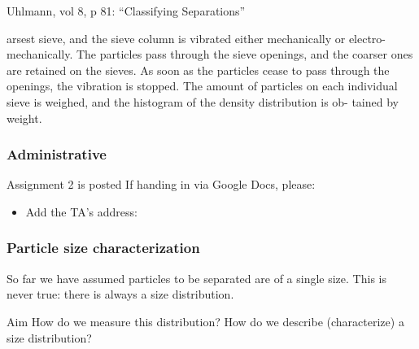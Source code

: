 Uhlmann, vol 8, p 81: ``Classifying Separations''

arsest sieve, and the sieve column is vibrated either mechanically or electro-mechanically. The particles pass through the sieve openings, and the coarser ones are retained on the sieves. As soon as the particles cease to pass through the openings, the vibration is stopped. The amount of particles on each individual sieve is weighed, and the histogram of the density distribution is ob- tained by weight.


\begin{frame}\frametitle{Administrative}
	Assignment 2 is posted
	\vspace{12pt}
	If handing in via Google Docs, please:
	\begin{itemize}
		\item	Add the TA's address: 
	\end{itemize}
\end{frame}

\begin{frame}\frametitle{Particle size characterization}
	So far we have assumed particles to be separated are of a single size. This is never true: there is always a size distribution.
	
	\vspace{12pt}
	\begin{exampleblock}{Aim}
		How do we measure this distribution? How do we describe (characterize) a size distribution? 
	\end{exampleblock}
\end{frame}